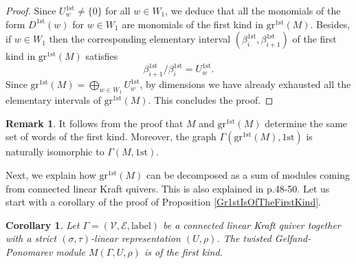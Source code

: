 \documentclass[12pt]{amsart}
\newtheorem{corollary}[theorem]{Corollary}
\theoremstyle{definition}
\newtheorem{remark}[theorem]{Remark}
\newcommand{\<}{\langle}   %
\renewcommand{\>}{\rangle} %
\begin{document}
\begin{proof}
    Since $U^{1\mathrm{st}}_{w} \not = \{0\}$ for all $w \in W_1$, we deduce that all the monomials of the form $D^{1\mathrm{st}}(w)$ for $w \in W_1$ are monomials of the first kind in $\mathrm{gr}^{1\mathrm{st}}(M)$. Besides, if $w \in W_1$ then the corresponding elementary interval $(\beta_i^{1\mathrm{st}}, \beta_{i+1}^{1\mathrm{st}})$ of the first kind in $\mathrm{gr}^{1\mathrm{st}}(M)$ satisfies 
    \begin{equation*}
        \beta_{i+1}^{1\mathrm{st}}/\beta_i^{1\mathrm{st}} = U^{1\mathrm{st}}_{w}.
    \end{equation*}
    Since $\mathrm{gr}^{1\mathrm{st}}(M) = \bigoplus_{w \in W_1} U^{1\mathrm{st}}_{w}$, by dimensions we have already exhausted all the elementary intervals of $\mathrm{gr}^{1\mathrm{st}}(M)$. This concludes the proof.
\end{proof}

\begin{remark}
    It follows from the proof that $M$ and $\mathrm{gr}^{1\mathrm{st}}(M)$ determine the same set of words of the first kind. Moreover, the graph $\Gamma(\mathrm{gr}^{1\mathrm{st}}(M),1\mathrm{st})$ is naturally isomorphic to $\Gamma(M,1\mathrm{st})$. 
\end{remark}

Next, we explain how $\mathrm{gr}^{1\mathrm{st}}(M)$ can be decomposed as a sum of modules coming from connected linear Kraft quivers. This is also explained in \cite{gelfand-ponomarev:1968} p.48-50. Let us start with a corollary of the proof of Proposition \ref{Gr1stIsOfTheFirstKind}.

\begin{corollary}\label{CorolAllLinearKraftAreFirstKind}
    Let $\Gamma = (\mathcal V,\mathcal E,\mathrm{label})$ be a connected linear Kraft quiver together with a strict $(\sigma,\tau)$-linear representation $(U,\rho)$. The twisted Gelfand-Ponomarev module $M(\Gamma,U,\rho)$ is of the first kind.
\end{corollary}
\end{document}
